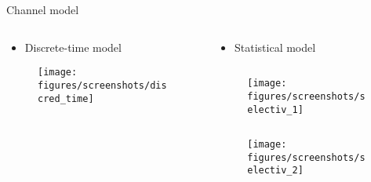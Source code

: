 \documentclass[xetex, onlymath, handout]{beamer}
\begin{document}
\begin{frame}{Channel model}
\begin{columns}
	\begin{column}{.5\linewidth}
		\begin{itemize}
			\item Discrete-time model
		\end{itemize}
		\vspace{0.2cm}
		\begin{figure}
			\texttt{[image: figures/screenshots/discred\_time]}
		\end{figure}
	\end{column}
	\begin{column}{.5\linewidth}
		\begin{itemize}
			\item Statistical model
		\end{itemize}
		\vspace{0.2cm}
		\begin{column}{.5\linewidth}
			\begin{figure}
				\texttt{[image: figures/screenshots/selectiv\_1]}
			\end{figure}
		\end{column}
		\begin{column}{.5\linewidth}
			\begin{figure}
				\texttt{[image: figures/screenshots/selectiv\_2]}
			\end{figure}
		\end{column}
	\end{column}
\end{columns}
\end{frame}





\end{document}
